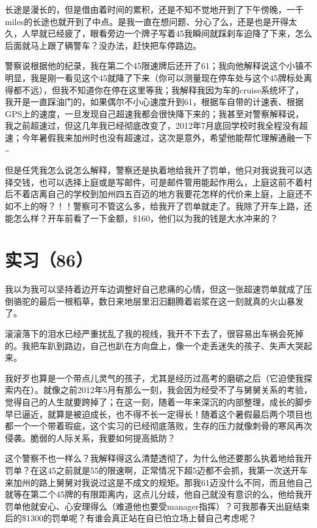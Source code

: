 \documentclass[12pt]{book}
\begin{document}
长途是漫长的，但是借由着时间的累积，还是不知不觉地开到了下午傍晚，一千miles的长途也就开到了中点。是我一直在想问题、分心了么，还是也是开得太久，人早就已经疲了，眼看旁边一个牌子写着45我瞬间就踩刹车迫降了下来，怎么后面就马上跟了辆警车？没办法，赶快把车停路边。

警察说根据他的纪录，我在第二个45限速牌后还开了61；我向他解释说这个小镇不明显，我是刚一看见这个45就降了下来（你可以测量现在停车处与这个45牌标处离得都不远），但我不知道你在停在这里等我；我解释我因为车的cruise系统坏了，我开是一直踩油门的，如果偶尔不小心速度升到61，根据车自带的计速表、根据GPS上的速度，一旦发现自己超速我都会很快降下来的；我甚至对警察解释说，我之前超速过，但这几年我已经彻底改变了，2012年7月底回学校时我全程没有超速；今年暑假我来加州时也没有超速过，这次是意外，希望他能帮忙理解通融一下\textasciitilde{}~

但是任凭我怎么说怎么解释，警察还是执着地给我开了罚单，他只对我说我可以选择交钱，也可以选择上庭或是写邮件，可是邮件管用能起作用么，上庭这前不着村后不着店离自己的学校到加州四五百迈的地方我要花怎样的代价来上庭，上庭还不如不上的呀？！！警察可不管这么多，给我开了罚单就走了。我除了开车上路，还能怎么样？开车前看了一下金额，\$160，他们以为我的钱是大水冲来的？


\section{实习（86）　}
\label{sec-5-89}

我以为我可以坚持着边开车边调整好自己悲痛的心情，但这一张超速罚单就成了压倒骆驼的最后一根稻草，数日来地层里汩汩翻腾着岩浆在这一刻就真的火山暴发了。

滚滚落下的泪水已经严重扰乱了我的视线，我开不下去了，很容易出车祸会死掉的。我把车趴到路边，自己也趴在方向盘上，像一个走丢迷失的孩子、失声大哭起来。

我好歹也算是一个带点儿灵气的孩子，尤其是经历过高考的磨砺之后（它迫使我探索内在）。就像之前2012年5月有那么一刻，我会因为经受不了与舅舅关系的考验，觉得自己的人生就要跨掉了；在这一刻，随着一年来深沉的内部整理，成长的脚步早已逼近，就算是被迫成长，也不得不长一定得长！随着这个暑假最后两个项目也都一个一个带着瑕疵，这个实习的已经彻底落败，生存的压力就像刺骨的寒风再次侵袭。脆弱的人际关系，我要如何提高抵防？

这个警察不也一样么？我解释得这么清楚透彻了，为什么他还要那么执着地给我开罚单？在这45之前就是55的限速啊，正常情况下超5迈都不会抓，我第一次送开车来加州的路上舅舅对我说过这是不成文的规矩。那我61迈没什么不同，而且他自己就等在第二个45牌的有限距离内，这点儿分歧，他自己就没有意识的么，他给我开罚单他就安心、心安理得么（难道他也要受manager指挥）？可我那春天出庭结束后的\$1300的罚单呢？有谁会真正站在自已怕立场上替自己考虑呢？
\end{document}
